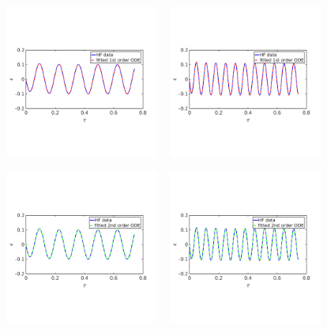 \documentclass[10pt,xcolor=dvipsnames,compress]{beamer}
\begin{document}
\begin{frame}
\begin{figure}
\includegraphics[trim = 0.in  2.3in 0.in 2.8in, clip, width=0.45\textwidth]{figs/Isin_int_epsfit_1st.png}
~
\includegraphics[trim = 0.in  2.3in 0.in 2.8in, clip, width=0.45\textwidth]{figs/Isin_high_epsfit_1st.png}
\end{figure}

\vspace{-0.18in}

\begin{figure}
\includegraphics[trim = 0.in  2.3in 0.in 2.8in, clip, width=0.45\textwidth]{figs/Isin_int_epsfit_2nd.png}
~
\includegraphics[trim = 0.in  2.3in 0.in 2.8in, clip, width=0.45\textwidth]{figs/Isin_high_epsfit_2nd.png}
\end{figure}


\vfill
\end{frame}
\end{document}

